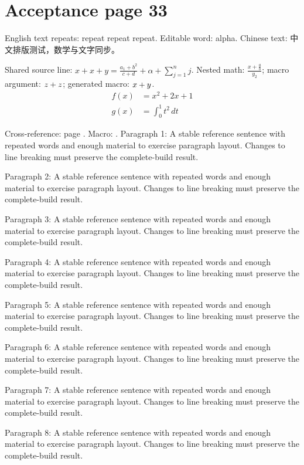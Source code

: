 \section*{Acceptance page 33}
\label{page:33}
English text repeats: repeat repeat repeat. Editable word: alpha.
Chinese text: 中文排版测试，数学与文字同步。\par
Shared source line: $x+x+y=\frac{a_{1}+b^{2}}{c+d}+\alpha+\sum_{j=1}^{n}j$.
Nested math: $\frac{x+\frac{a}{b}}{y_{2}}$; macro argument: $z+z$; generated macro: $x+y$.
\begin{align*}
 f(x)&=x^{2}+2x+1\\
 g(x)&=\int_{0}^{1} t^{2}\,dt
\end{align*}
\par Cross-reference: page \pageref{page:1}. Macro: \globalword.
Paragraph 1: A stable reference sentence with repeated words and enough material to exercise paragraph layout. Changes to line breaking must preserve the complete-build result.\par
Paragraph 2: A stable reference sentence with repeated words and enough material to exercise paragraph layout. Changes to line breaking must preserve the complete-build result.\par
Paragraph 3: A stable reference sentence with repeated words and enough material to exercise paragraph layout. Changes to line breaking must preserve the complete-build result.\par
Paragraph 4: A stable reference sentence with repeated words and enough material to exercise paragraph layout. Changes to line breaking must preserve the complete-build result.\par
Paragraph 5: A stable reference sentence with repeated words and enough material to exercise paragraph layout. Changes to line breaking must preserve the complete-build result.\par
Paragraph 6: A stable reference sentence with repeated words and enough material to exercise paragraph layout. Changes to line breaking must preserve the complete-build result.\par
Paragraph 7: A stable reference sentence with repeated words and enough material to exercise paragraph layout. Changes to line breaking must preserve the complete-build result.\par
Paragraph 8: A stable reference sentence with repeated words and enough material to exercise paragraph layout. Changes to line breaking must preserve the complete-build result.\par
\newpage
